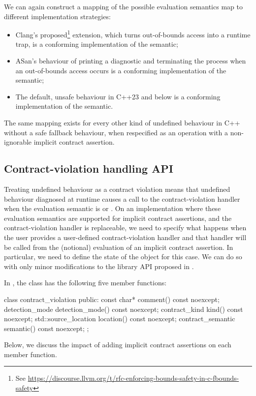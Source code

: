 We can again construct a mapping of the possible evaluation semantics map to different implementation strategies:
\begin{itemize}
\item Clang's proposed\footnote{See \url{https://discourse.llvm.org/t/rfc-enforcing-bounds-safety-in-c-fbounds-safety}}  extension, which turns out-of-bounds access into a runtime trap, is a conforming implementation of the  semantic;
\item ASan's behaviour of printing a diagnostic and terminating the process when an  out-of-bounds access occurs is a conforming implementation of the  semantic;
\item The default, unsafe behaviour in C++23 and below is a conforming implementation of the  semantic.
\end{itemize}
The same mapping exists for every other kind of undefined behaviour in C++ without a safe fallback behaviour, when respecified as an operation with a non-ignorable implicit contract assertion.

\subsection{Contract-violation handling API}

Treating undefined behaviour as a contract violation means that undefined behaviour diagnosed at runtime causes a call to the contract-violation handler when the evaluation semantic is  or . On an implementation where these evaluation semantics are supported for implicit contract assertions, and the contract-violation handler is replaceable, we need to specify what happens when the user provides a user-defined  contract-violation handler and that handler will be called from the (notional) evaluation of an implicit contract assertion. In particular, we need to define the state of the  object for this case. We can do so with only minor modifications to the library API proposed in \cite{P2900R7}. 

In \cite{P2900R7}, the  class has the following five member functions:
\begin{codeblock}
class contract_violation {
public:
  const char* comment() const noexcept;
  detection_mode detection_mode() const noexcept;
  contract_kind kind() const noexcept;
  std::source_location location() const noexcept;
  contract_semantic semantic() const noexcept;
};
\end{codeblock}
Below, we discuss the impact of adding implicit contract assertions on each member function.

